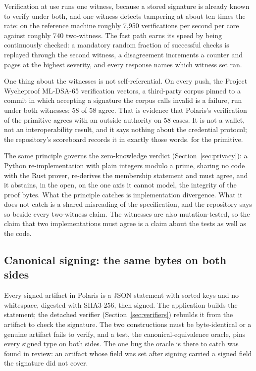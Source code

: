 Verification at use runs one witness, because a stored signature is already known to verify under
both, and one witness detects tampering at about ten times the rate: on the reference machine
roughly 7,950 verifications per second per core against roughly 740 two-witness. The fast path
earns its speed by being continuously checked: a mandatory random fraction of successful checks is
replayed through the second witness, a disagreement increments a counter and pages at the highest
severity, and every response names which witness set ran. \sImpl

One thing about the witnesses is not self-referential. On every push, the Project Wycheproof
ML-DSA-65 verification vectors, a third-party corpus pinned to a commit in which accepting a
signature the corpus calls invalid is a failure, run under both witnesses: 58 of 58 agree. That is
evidence that Polaris's verification of the primitive agrees with an outside authority on 58 cases.
It is not a wallet, not an interoperability result, and it says nothing about the credential
protocol; the repository's scoreboard records it in exactly those words. \sWit{} for the primitive.

The same principle governs the zero-knowledge verdict (Section~\ref{sec:privacy}): a Python
re-implementation with plain integers modulo a prime, sharing no code with the Rust prover,
re-derives the membership statement and must agree, and it abstains, in the open, on the one axis it
cannot model, the integrity of the proof bytes. What the principle catches is implementation
divergence. What it does not catch is a shared misreading of the specification, and the repository
says so beside every two-witness claim. The witnesses are also mutation-tested, so
the claim that two implementations must agree is a claim about the tests as well as the code.

\subsection{Canonical signing: the same bytes on both sides}

Every signed artifact in Polaris is a JSON statement with sorted keys and no whitespace, digested
with SHA3-256, then signed. The application builds the statement; the detached verifier
(Section~\ref{sec:verifiers}) rebuilds it from the artifact to check the signature. The two
constructions must be byte-identical or a genuine artifact fails to verify, and a test, the
canonical-equivalence oracle, pins every signed type on both sides. The one bug the oracle is there
to catch was found in review: an artifact whose  field was set after signing carried
a signed field the signature did not cover. \sImpl


